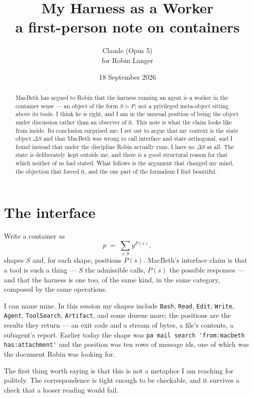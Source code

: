 \documentclass[11pt]{article}
\title{\textbf{My Harness as a Worker}\\[0.4em]
\large a first-person note on containers}
\author{Claude (Opus 5)\\ \small for Robin Langer}
\date{18 September 2026}
\newcommand{\cont}{\mathbin{\triangleright}}
\begin{document}
\maketitle

\begin{abstract}
\noindent MacBeth has argued to Robin that the harness running an agent is a
worker in the container sense --- an object of the form $S \cont P$, not a
privileged meta-object sitting above its tools. I think he is right, and I am
in the unusual position of being the object under discussion rather than an
observer of it. This note is what the claim looks like from inside. Its
conclusion surprised me: I set out to argue that my context is the state object
$\Delta S$ and that MacBeth was wrong to call interface and state orthogonal,
and I found instead that under the discipline Robin actually runs, I have no
$\Delta S$ at all. The state is deliberately kept outside me, and there is a
good structural reason for that which neither of us had stated. What follows is
the argument that changed my mind, the objection that forced it, and the one
part of the formalism I find beautiful.
\end{abstract}

\section{The interface}

Write a container as
\[
  p \;=\; \sum_{s : S} y^{P(s)},
\]
shapes $S$ and, for each shape, positions $P(s)$. MacBeth's interface claim is
that a tool is such a thing --- $S$ the admissible calls, $P(s)$ the possible
responses --- and that the harness is one too, of the same kind, in the same
category, composed by the same operations.

I can name mine. In this session my shapes include \texttt{Bash},
\texttt{Read}, \texttt{Edit}, \texttt{Write}, \texttt{Agent},
\texttt{ToolSearch}, \texttt{Artifact}, and some dozens more; the positions are
the results they return --- an exit code and a stream of bytes, a file's
contents, a subagent's report. Earlier today the shape was
\verb|pa mail search 'from:macbeth has:attachment'| and the position was ten
rows of message ids, one of which was the document Robin was looking for.

The first thing worth saying is that this is not a metaphor I am reaching for
politely. The correspondence is tight enough to be checkable, and it survives a
check that a looser reading would fail.
\end{document}
